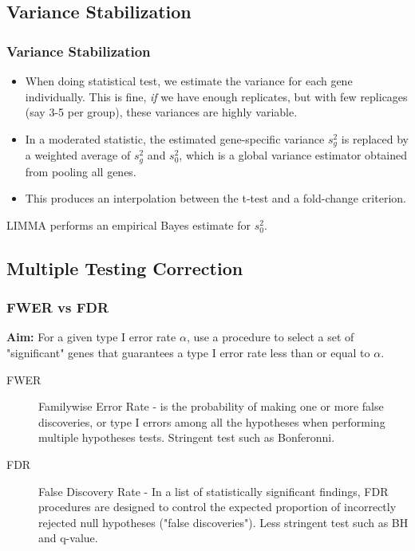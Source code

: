 \documentclass[pdf]{beamer}
\begin{document}
\subsection{Variance Stabilization}


\begin{frame}
  \frametitle{Variance Stabilization}
  \begin{itemize}
  \item When doing statistical test, we estimate the variance for each gene individually. This is fine, \textit{if} we have enough replicates, but with few replicages (say 3-5 per group), these variances are highly variable.
  \item In a moderated statistic, the estimated gene-specific variance $s^2_g$ is replaced by a weighted average of $s^2_g$ and $s^2_0$, which is a global variance estimator obtained from pooling all genes.
  \item This produces an interpolation between the t-test and a fold-change criterion.
  \end{itemize}
LIMMA performs an empirical Bayes estimate for $s^2_0$.
\end{frame}

\subsection{Multiple Testing Correction}
\begin{frame}
  \frametitle{FWER vs FDR}
  \textbf{Aim:} For a given type I error rate $\alpha$, use a procedure to select a set of "significant" genes that guarantees a type I error rate less than or equal to $\alpha$.   
  \begin{description}
  \item[FWER] Familywise Error Rate - is the probability of making one or more false discoveries, or type I errors among all the hypotheses when performing multiple hypotheses tests. Stringent test such as Bonferonni.
  \item[FDR] False Discovery Rate - In a list of statistically significant findings, FDR procedures are designed to control the expected proportion of incorrectly rejected null hypotheses ("false discoveries"). Less stringent test such as BH and q-value.
  \end{description}
\end{frame}
\end{document}
